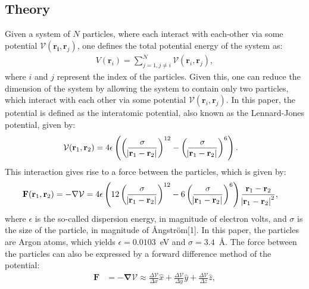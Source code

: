 \documentclass[a4paper]{article}
\newcommand{\grad}{\mathbf{\nabla}}
\begin{document}
\subsection{Theory}
Given a system of $N$ particles, where each interact with each-other via some potential $\mathcal{V}(\mathbf{r_i}, \mathbf{r}_j)$, one defines the total potential energy of the system as:
\begin{align*}
    V(\mathbf{r}_i) = \sum_{j=1, j\neq i}^N \mathcal{V}(\mathbf{r}_i, \mathbf{r}_j),
\end{align*}where $i$ and $j$ represent the index of the particles. Given this, one can reduce the dimension of the system by allowing the system to contain only two particles, which interact with each other via some potential $\mathcal{V}(\mathbf{r}_i, \mathbf{r}_j)$. In this paper, the potential is defined as the interatomic potential, also known as the Lennard-Jones potential, given by:
\begin{align}
    \mathcal{V}(\mathbf{r}_1, \mathbf{r}_2) &= 4\epsilon\left(\left(\frac{\sigma}{\abs{\mathbf{r}_1 - \mathbf{r}_2}}\right)^{12} - \left(\frac{\sigma}{\abs{\mathbf{r}_1 - \mathbf{r}_2}}\right)^6\right). \label{eq: LJ Potential}
\end{align}This interaction gives rise to a force between the particles, which is given by:
\begin{align}
    \mathbf{F}(\mathbf{r}_1, \mathbf{r}_2) &= -\grad{\mathcal{V}} = 4\epsilon\left(12\left(\frac{\sigma}{\abs{\mathbf{r}_1 - \mathbf{r}_2}}\right)^{12} - 6\left(\frac{\sigma}{\abs{\mathbf{r}_1 - \mathbf{r}_2}}\right)^6 \right)\frac{\mathbf{r}_1 - \mathbf{r}_2}{\abs{\mathbf{r}_1 - \mathbf{r}_2}^2},\label{eq: LJ Force}
\end{align}where $\epsilon$ is the so-called dispersion energy, in magnitude of electron volts, and $\sigma$ is the size of the particle, in magnitude of Ångström[1]. 
In this paper, the particles are Argon atoms, which yields $\epsilon = 0.0103$~eV and $\sigma = 3.4$~Å. The force between the particles can also be expressed by a forward difference method of the potential:
\begin{align}
    \mathbf{F} &= -\grad{\mathcal{V}} \approx \frac{\Delta \mathcal{V}}{\Delta x}\hat{x} + \frac{\Delta \mathcal{V}}{\Delta y}\hat{y} + \frac{\Delta \mathcal{V}}{\Delta z}\hat{z}, \label{eq: Difference force}
\end{align}
\end{document}
